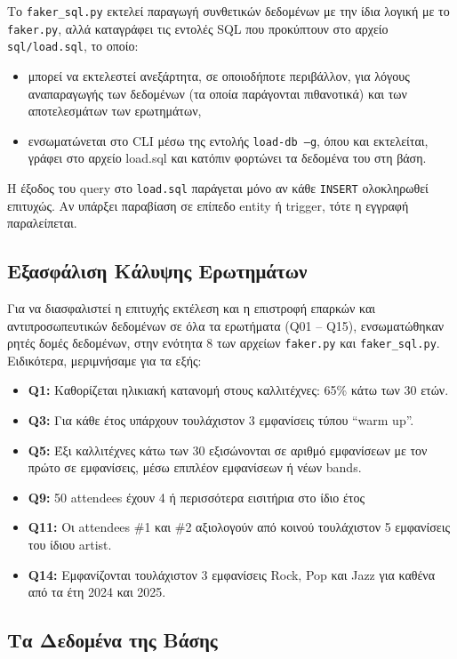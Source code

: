\documentclass[13pt]{extarticle}
\begin{document}
Το \texttt{faker\_sql.py} εκτελεί παραγωγή συνθετικών δεδομένων με την ίδια λογική με το \texttt{faker.py}, αλλά καταγράφει τις εντολές SQL που προκύπτουν στο αρχείο \texttt{sql/load.sql}, το οποίο:
\begin{itemize}
    \item μπορεί να εκτελεστεί ανεξάρτητα, σε οποιοδήποτε περιβάλλον, για λόγους αναπαραγωγής των δεδομένων (τα οποία παράγονται πιθανοτικά) και των αποτελεσμάτων των ερωτημάτων,
    \item ενσωματώνεται στο CLI μέσω της εντολής \texttt{load-db --g}, όπου και εκτελείται, γράφει στο αρχείο load.sql και κατόπιν φορτώνει τα δεδομένα του στη βάση.
\end{itemize}

Η έξοδος του query στο \texttt{load.sql} παράγεται μόνο αν κάθε \texttt{INSERT} ολοκληρωθεί επιτυχώς. Αν υπάρξει παραβίαση σε επίπεδο entity ή trigger, τότε η εγγραφή παραλείπεται.

\subsection{Εξασφάλιση Κάλυψης Ερωτημάτων}

Για να διασφαλιστεί η επιτυχής εκτέλεση και η επιστροφή επαρκών και αντιπροσωπευτικών δεδομένων σε όλα τα ερωτήματα (Q01 -- Q15), ενσωματώθηκαν ρητές δομές δεδομένων, στην ενότητα 8 των αρχείων \texttt{faker.py} και \texttt{faker\_sql.py}. Ειδικότερα, μεριμνήσαμε για τα εξής:
\begin{itemize}
    \item \textbf{Q1:} Καθορίζεται ηλικιακή κατανομή στους καλλιτέχνες: 65\% κάτω των 30 ετών.
    \item \textbf{Q3:} Για κάθε έτος υπάρχουν τουλάχιστον 3 εμφανίσεις τύπου ``warm up''.
    \item \textbf{Q5:} Έξι καλλιτέχνες κάτω των 30 εξισώνονται σε αριθμό εμφανίσεων με τον πρώτο σε εμφανίσεις, μέσω επιπλέον εμφανίσεων ή νέων bands.
    \item \textbf{Q9:} 50 attendees έχουν 4 ή περισσότερα εισιτήρια στο ίδιο έτος
    \item \textbf{Q11:} Οι attendees \#1 και \#2 αξιολογούν από κοινού τουλάχιστον 5 εμφανίσεις του ίδιου artist.
    \item \textbf{Q14:} Εμφανίζονται τουλάχιστον 3 εμφανίσεις Rock, Pop και Jazz για καθένα από τα έτη 2024 και 2025.
\end{itemize}

\clearpage
\subsection{Τα Δεδομένα της Βάσης}
\end{document}
